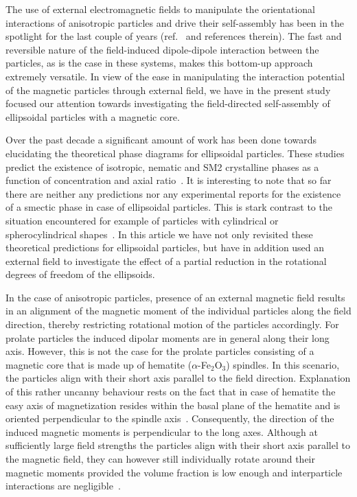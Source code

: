 \documentclass[aps,prl,preprint,superscriptaddress]{revtex4-1}
\begin{document}
The use of external electromagnetic fields to manipulate the orientational interactions of anisotropic particles and drive their self-assembly has been in the spotlight for the last couple of years (ref.~\cite{op2013phase, Schurtenberger2016, ganesan2017high, shah2015actuation} and references therein). The fast and reversible nature of the field-induced dipole-dipole interaction between the particles, as is the case in these systems, makes this bottom-up approach extremely versatile. In view of the ease in manipulating the interaction potential of the magnetic particles through external field, we have in the present study focused our attention towards investigating the field-directed self-assembly of ellipsoidal particles with a magnetic core.\par
Over the past decade a significant amount of work has been done towards elucidating the theoretical phase diagrams for ellipsoidal particles. These studies predict the existence of isotropic, nematic and SM2 crystalline phases as a function of concentration and axial ratio~\cite{radu2009solid, odriozola2012revisiting, pfleiderer2008crystal}. It is interesting to note that so far there are neither any predictions nor any experimental reports for the existence of a smectic phase in case of ellipsoidal particles. This is stark contrast to the situation encountered for example of particles with cylindrical or spherocylindrical shapes~\cite{Bolhuis1997, lekkerkerker2013liquid}. In this article we have not only revisited these theoretical predictions for ellipsoidal particles, but have in addition used an external field to investigate the effect of a partial reduction in the rotational degrees of freedom of the ellipsoids.\par
In the case of anisotropic particles, presence of an external magnetic field results in an alignment of the magnetic moment of the individual particles along the field direction, thereby restricting rotational motion of the particles accordingly. For prolate particles the induced dipolar moments are in general along their long axis. However, this is not the case for the prolate particles consisting of a magnetic core that is made up of hematite ($\alpha$-Fe$_2$O$_3$) spindles. In this scenario, the particles align with their short axis parallel to the field direction. Explanation of this rather uncanny behaviour rests on the fact that in case of hematite the easy axis of magnetization resides within the basal plane of the hematite and is oriented perpendicular to the spindle axis~\cite{reufer2011magnetization}. Consequently, the direction of the induced magnetic moments is perpendicular to the long axes. Although at sufficiently large field strengths the particles align with their short axis parallel to the magnetic field, they can however still individually rotate around their magnetic moments provided the volume fraction is low enough and interparticle interactions are negligible~\cite{reufer2010morphology}. \par
\end{document}
